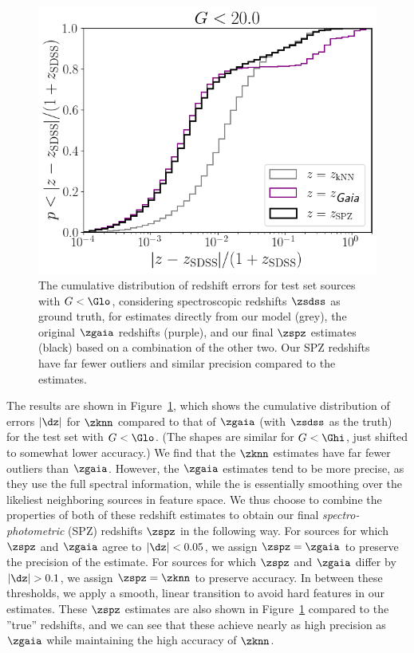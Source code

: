 \begin{figure}
    \centering
    \includegraphics[width=0.55\columnwidth]{redshift_error_cumulative_Glo.png}
    \caption{The cumulative distribution of redshift errors for \cat test set sources with $G<\protect\Glo$, considering \SDSS spectroscopic redshifts $\zsdss$ as ground truth, for estimates directly from our \knn model (grey), the original $\zgaia$ redshifts (purple), and our final $\zspz$ estimates (black) based on a combination of the other two. Our SPZ redshifts have far fewer outliers and similar precision compared to the \Gaia estimates.}
    \label{fig:z_error_cumulative}
\end{figure}

The results are shown in Figure~\ref{fig:z_error_cumulative}, which shows the cumulative distribution of errors $|\dz|$ for $\zknn$ compared to that of $\zgaia$ (with $\zsdss$ as the truth) for the test set with $G<\Glo$.
(The shapes are similar for $G<\Ghi$, just shifted to somewhat lower accuracy.)
We find that the $\zknn$ estimates have far fewer outliers than $\zgaia$.
However, the $\zgaia$ estimates tend to be more precise, as they use the full spectral information, while the \knn is essentially smoothing over the likeliest neighboring sources in feature space. 
We thus choose to combine the properties of both of these redshift estimates to obtain our final \emph{spectro-photometric} (SPZ) redshifts $\zspz$ in the following way.
For sources for which $\zspz$ and $\zgaia$ agree to $|\dz|<0.05$, we assign $\zspz = \zgaia$ to preserve the precision of the \Gaia estimate.
For sources for which $\zspz$ and $\zgaia$ differ by $|\dz|>0.1$, we assign $\zspz = \zknn$ to preserve accuracy.
In between these thresholds, we apply a smooth, linear transition to avoid hard features in our estimates.
These $\zspz$ estimates are also shown in Figure~\ref{fig:z_error_cumulative} compared to the ''true'' \SDSS redshifts, and we can see that these achieve nearly as high precision as $\zgaia$ while maintaining the high accuracy of $\zknn$.

